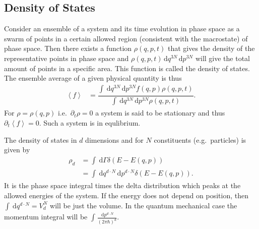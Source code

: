 \documentclass[a4paper,10pt]{article}
\newcommand{\td}{\,\text{d}}
\numberwithin{equation}{section}
\begin{document}
\begin{multicols}{2}
\section{Density of States}
Consider an ensemble of a system and its time evolution in phase space as a swarm of points in a certain allowed region (consistent with the macrostate) of phase space.
Then there exists a function $\rho \left(q,p,t\right)$ that gives the density of the representative points in phase space and $\rho \left(q,p,t\right)\td q ^{3N}\td p ^{3N}$ will give the total amount of points in a specific area.
This function is called the density of states.
The ensemble average of a given physical quantity is thus
\begin{align} 
  \left\langle f \right\rangle  &= \dfrac{\int_{}^{}\td q ^{3N}\td p ^{3N}f\left(q,p\right)\rho \left(q,p,t\right)}{\int_{}^{}\td q ^{3N}\td p ^{3N}\rho (q,p,t)}
.\end{align} 
For $\rho =\rho (q,p)$ i.e.\ $\partial_t \rho =0$ a system is said to be stationary and thus $\partial_t\left\langle f \right\rangle =0$.
Such a system is in equlibrium.

The density of states in $d$ dimensions and for $N$ constituents (e.g.\ particles) is given by
\begin{align} 
  \rho _d &= \int_{}^{}\td \Gamma \delta \left(E-E(q,p)\right)\\
        &= \int_{}^{}\td q ^{d\cdot N}\td p ^{d\cdot N}\delta (E-E(q,p))
.\end{align} 
It is the phase space integral times the delta distribution which peaks at the allowed energies of the system.
If the energy does not depend on position, then $\int_{}^{}\td q ^{d\cdot N}=V_d^N$ will be just the volume.
In the quantum mechanical case the momentum integral will be $\int_{}^{}\tfrac{\td p ^{d\cdot N}}{(2\pi \hbar )^d}$.


\end{multicols}
\end{document}
